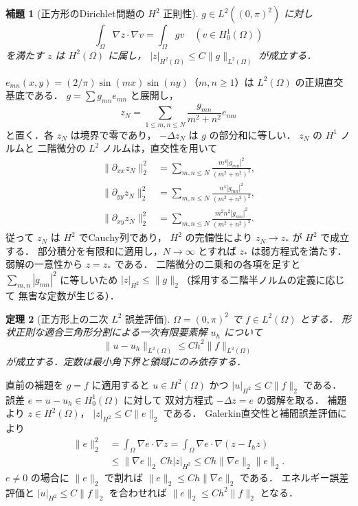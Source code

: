 \documentclass[a5paper,10pt,onecolumn]{jsarticle}
\makeatletter
\theoremstyle{mathnotetheorem}
\newtheorem{theorem}{定理}[section]
\newtheorem{lemma}[theorem]{補題}
\renewcommand{\proofname}{証明}
\renewenvironment{proof}[1][\proofname]{%
  \par\pushQED{\qed}\normalfont\topsep4\p@\@plus2\p@\relax
  \trivlist\item[\hskip\labelsep\bfseries #1]\ignorespaces
}{\popQED\endtrivlist\@endpefalse}
\newcommand{\norm}[1]{\lVert #1\rVert}
\makeatother
\begin{document}
\begin{lemma}[正方形のDirichlet問題の $H^2$ 正則性]
$g\in L^2((0,\pi)^2)$ に対し
\[
 \int_\Omega\nabla z\cdot\nabla v=\int_\Omega gv
 \quad(v\in H_0^1(\Omega))
\]
を満たす $z$ は $H^2(\Omega)$ に属し，
$|z|_{H^2(\Omega)}\le C\norm g_{L^2(\Omega)}$ が成立する．
\end{lemma}
\begin{proof}
$e_{mn}(x,y)=(2/\pi)\sin(mx)\sin(ny)$（$m,n\ge1$）は
$L^2(\Omega)$ の正規直交基底である．
$g=\sum g_{mn}e_{mn}$ と展開し，
\[
 z_N=\sum_{1\le m,n\le N}\frac{g_{mn}}{m^2+n^2}e_{mn}
\]
と置く．各 $z_N$ は境界で零であり，
$-\Delta z_N$ は $g$ の部分和に等しい．
$z_N$ の $H^1$ ノルムと
二階微分の $L^2$ ノルムは，直交性を用いて
\[
 \begin{split}
 \norm{\partial_{xx}z_N}_2^2
 &=\sum_{m,n\le N}\frac{m^4|g_{mn}|^2}{(m^2+n^2)^2},\\
 \norm{\partial_{yy}z_N}_2^2
 &=\sum_{m,n\le N}\frac{n^4|g_{mn}|^2}{(m^2+n^2)^2},\\
 \norm{\partial_{xy}z_N}_2^2
 &=\sum_{m,n\le N}\frac{m^2n^2|g_{mn}|^2}{(m^2+n^2)^2}.
 \end{split}
\]
従って $z_N$ は $H^2$ でCauchy列であり，
$H^2$ の完備性により $z_N\to z_*$ が $H^2$ で成立する．
部分積分を有限和に適用し，$N\to\infty$ とすれば
$z_*$ は弱方程式を満たす．弱解の一意性から $z=z_*$ である．
二階微分の二乗和の各項を足すと
$\sum_{m,n} |g_{mn}|^2$ に等しいため
$|z|_{H^2}\le\norm g_2$（採用する二階半ノルムの定義に応じて
無害な定数が生じる）．
\end{proof}

\begin{theorem}[正方形上の二次 $L^2$ 誤差評価]
$\Omega=(0,\pi)^2$ で $f\in L^2(\Omega)$ とする．
形状正則な適合三角形分割による一次有限要素解 $u_h$ について
\[
 \norm{u-u_h}_{L^2(\Omega)}\le C h^2\norm f_{L^2(\Omega)}
\]
が成立する．定数は最小角下界と領域にのみ依存する．
\end{theorem}
\begin{proof}
直前の補題を $g=f$ に適用すると
$u\in H^2(\Omega)$ かつ $|u|_{H^2}\le C\norm f_2$ である．
誤差 $e=u-u_h\in H_0^1(\Omega)$ に対して
双対方程式 $-\Delta z=e$ の弱解を取る．
補題より $z\in H^2(\Omega)$，
$|z|_{H^2}\le C\norm e_2$ である．
Galerkin直交性と補間誤差評価により
\[
 \begin{aligned}
 \norm e_2^2
 &=\int_\Omega\nabla e\cdot\nabla z
   =\int_\Omega\nabla e\cdot\nabla(z-I_hz)\\
 &\le\norm{\nabla e}_2\,Ch|z|_{H^2}
 \le Ch\norm{\nabla e}_2\norm e_2.
 \end{aligned}
\]
$e\ne0$ の場合に $\norm e_2$ で割れば
$\norm e_2\le Ch\norm{\nabla e}_2$ である．
エネルギー誤差評価と $|u|_{H^2}\le C\norm f_2$ を合わせれば
$\norm e_2\le Ch^2\norm f_2$ となる．
\end{proof}
\end{document}
